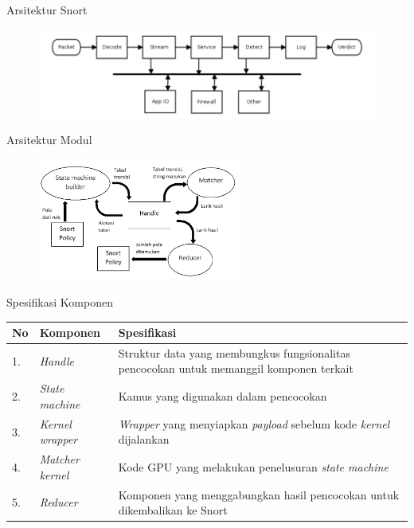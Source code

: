 \documentclass[10pt]{beamer}
\begin{document}
\begin{frame}{Arsitektur Snort}
    \begin{figure}
        \centering
        \includegraphics[width=1.0\textwidth]{../src/resources/snort3.png}
    \end{figure}
\end{frame}

\begin{frame}{Arsitektur Modul}
    \begin{figure}
        \centering
        \includegraphics[width=0.6\textwidth]{../src/resources/module-arch.png}
    \end{figure}
\end{frame}

\begin{frame}{Spesifikasi Komponen}
    \begin{table}
    \begin{tabular}{@{} llp{7cm} @{}}
        \toprule
        No & Komponen & Spesifikasi\\
        \midrule
        1. & \emph{Handle} & Struktur data yang membungkus fungsionalitas pencocokan untuk memanggil komponen terkait\\
        2. & \emph{State machine} & Kamus yang digunakan dalam pencocokan\\
        3. & \emph{Kernel wrapper} & \emph{Wrapper} yang menyiapkan \emph{payload} sebelum kode \emph{kernel} dijalankan\\
        4. & \emph{Matcher kernel} & Kode GPU yang melakukan penelusuran \emph{state machine}\\
        5. & \emph{Reducer} & Komponen yang menggabungkan hasil pencocokan untuk dikembalikan ke Snort\\
        \bottomrule
    \end{tabular}
    \end{table}
\end{frame}
\end{document}

